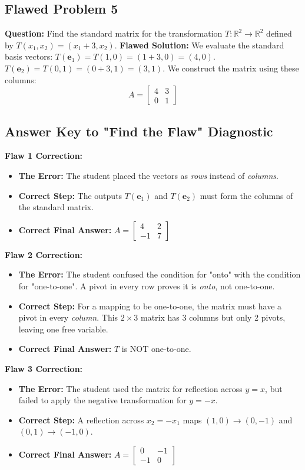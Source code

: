 \documentclass[11pt]{article}
\begin{document}
\vspace{2cm}
\subsection*{Flawed Problem 5}
\textbf{Question:} Find the standard matrix for the transformation $T: \mathbb{R}^2 \to \mathbb{R}^2$ defined by $T(x_1, x_2) = (x_1 + 3, x_2)$.
\textbf{Flawed Solution:}
We evaluate the standard basis vectors:
$T(\mathbf{e}_1) = T(1, 0) = (1 + 3, 0) = (4, 0)$.
$T(\mathbf{e}_2) = T(0, 1) = (0 + 3, 1) = (3, 1)$.
We construct the matrix using these columns:
\[ A = \begin{bmatrix} 4 & 3 \\ 0 & 1 \end{bmatrix} \]


\newpage
\subsection*{Answer Key to "Find the Flaw" Diagnostic}

\textbf{Flaw 1 Correction:}
\begin{itemize}
    \item \textbf{The Error:} The student placed the vectors as \textit{rows} instead of \textit{columns}. 
    \item \textbf{Correct Step:} The outputs $T(\mathbf{e}_1)$ and $T(\mathbf{e}_2)$ must form the columns of the standard matrix.
    \item \textbf{Correct Final Answer:} $A = \begin{bmatrix} 4 & 2 \\ -1 & 7 \end{bmatrix}$
\end{itemize}

\textbf{Flaw 2 Correction:}
\begin{itemize}
    \item \textbf{The Error:} The student confused the condition for "onto" with the condition for "one-to-one". A pivot in every row proves it is \textit{onto}, not one-to-one.
    \item \textbf{Correct Step:} For a mapping to be one-to-one, the matrix must have a pivot in every \textit{column}. This $2 \times 3$ matrix has 3 columns but only 2 pivots, leaving one free variable.
    \item \textbf{Correct Final Answer:} $T$ is NOT one-to-one.
\end{itemize}

\textbf{Flaw 3 Correction:}
\begin{itemize}
    \item \textbf{The Error:} The student used the matrix for reflection across $y=x$, but failed to apply the negative transformation for $y=-x$. 
    \item \textbf{Correct Step:} A reflection across $x_2 = -x_1$ maps $(1,0) \to (0,-1)$ and $(0,1) \to (-1,0)$. 
    \item \textbf{Correct Final Answer:} $A = \begin{bmatrix} 0 & -1 \\ -1 & 0 \end{bmatrix}$
\end{itemize}
\end{document}
